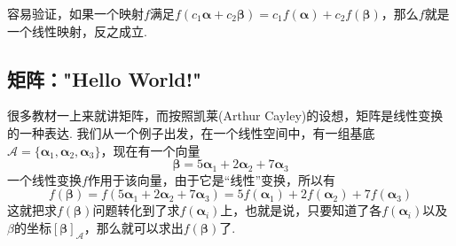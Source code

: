 \documentclass[main.tex]{subfiles}
\begin{document}
容易验证，如果一个映射\(f\)满足\(f(c_1\bm\alpha+c_2\bm\beta) = c_1f(\bm\alpha) + c_2f(\bm\beta)\)，那么\(f\)就是一个线性映射，反之成立. 

\subsection{矩阵："Hello World!"}

很多教材一上来就讲矩阵，而按照凯莱(Arthur Cayley)的设想，矩阵是线性变换的一种表达. 我们从一个例子出发，在一个线性空间中，有一组基底\(\mathcal A = \{\bm\alpha_1,\bm\alpha_2,\bm\alpha_3\}\)，现在有一个向量
\[\bm\beta = 5\bm\alpha_1+2\bm\alpha_2+7\bm\alpha_3\]
一个线性变换\(f\)作用于该向量，由于它是“线性”变换，所以有
\[f(\bm\beta) = f(5\bm\alpha_1+2\bm\alpha_2+7\bm\alpha_3) = 5f(\bm\alpha_1)+2f(\bm\alpha_2)+7f(\bm\alpha_3)\]
这就把求\(f(\bm\beta)\)问题转化到了求\(f(\bm\alpha_i)\)上，也就是说，只要知道了各\(f(\bm\alpha_i)\)以及\(\beta\)的坐标\([\bm\beta]_\mathcal{A}\)，那么就可以求出\(f(\bm\beta)\)了.
\end{document}
